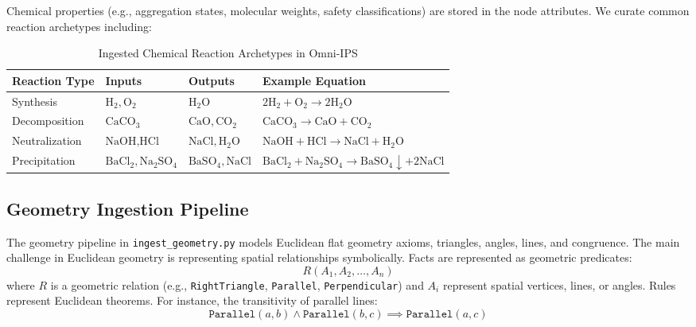 Chemical properties (e.g., aggregation states, molecular weights, safety classifications) are stored in the node attributes. We curate common reaction archetypes including:
\begin{table}[h]
    \centering
    \caption{Ingested Chemical Reaction Archetypes in Omni-IPS}
    \label{tab:chem_reactions}
    \begin{tabular}{llll}
        \toprule
        \textbf{Reaction Type} & \textbf{Inputs} & \textbf{Outputs} & \textbf{Example Equation} \\
        \midrule
        Synthesis & $\text{H}_2, \text{O}_2$ & $\text{H}_2\text{O}$ & $2\text{H}_2 + \text{O}_2 \to 2\text{H}_2\text{O}$ \\
        Decomposition & $\text{CaCO}_3$ & $\text{CaO}, \text{CO}_2$ & $\text{CaCO}_3 \to \text{CaO} + \text{CO}_2$ \\
        Neutralization & $\text{NaOH}, \text{HCl}$ & $\text{NaCl}, \text{H}_2\text{O}$ & $\text{NaOH} + \text{HCl} \to \text{NaCl} + \text{H}_2\text{O}$ \\
        Precipitation & $\text{BaCl}_2, \text{Na}_2\text{SO}_4$ & $\text{BaSO}_4, \text{NaCl}$ & $\text{BaCl}_2 + \text{Na}_2\text{SO}_4 \to \text{BaSO}_4 \downarrow + 2\text{NaCl}$ \\
        \bottomrule
    \end{tabular}
\end{table}

\subsection{Geometry Ingestion Pipeline}
The geometry pipeline in \texttt{ingest\_geometry.py} models Euclidean flat geometry axioms, triangles, angles, lines, and congruence. The main challenge in Euclidean geometry is representing spatial relationships symbolically. Facts are represented as geometric predicates:
\begin{equation}
    R(A_1, A_2, \dots, A_n)
\end{equation}
where $R$ is a geometric relation (e.g., \texttt{RightTriangle}, \texttt{Parallel}, \texttt{Perpendicular}) and $A_i$ represent spatial vertices, lines, or angles. Rules represent Euclidean theorems. For instance, the transitivity of parallel lines:
\begin{equation}
    \texttt{Parallel}(a,b) \land \texttt{Parallel}(b,c) \implies \texttt{Parallel}(a,c)
\end{equation}

